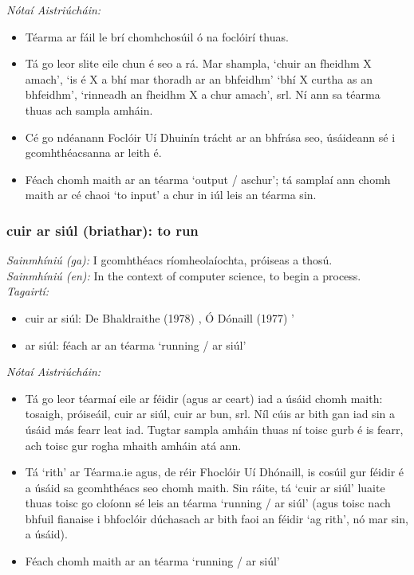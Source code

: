 \documentclass{article}
\begin{document}
 \noindent \textit{Nótaí Aistriúcháin:}
\begin{itemize}
	\item Téarma ar fáil le brí chomhchosúil ó na foclóirí thuas.
	\item Tá go leor slite eile chun é seo a rá. Mar shampla, `chuir an fheidhm X amach', `is é X a bhí mar thoradh ar an bhfeidhm' `bhí X curtha as an bhfeidhm', `rinneadh an fheidhm X a chur amach', srl. Ní ann sa téarma thuas ach sampla amháin.
	\item Cé go ndéanann Foclóir Uí Dhuinín trácht ar an bhfrása seo, úsáideann sé i gcomhthéacsanna ar leith é.
	\item Féach chomh maith ar an téarma `output / aschur'; tá samplaí ann chomh maith ar cé chaoi `to input' a chur in iúl leis an téarma sin.
\end{itemize}


\subsubsection*{cuir ar siúl (briathar): to run}
 \noindent \textit{Sainmhíniú (ga):} I gcomhthéacs ríomheolaíochta, próiseas a thosú.
\\
 \noindent \textit{Sainmhíniú (en):} In the context of computer science, to begin a process.
\\
 \noindent \textit{Tagairtí:}
\begin{itemize}
	\item cuir ar siúl: De Bhaldraithe (1978) \cite{de-bhaldraithe}, Ó Dónaill (1977) \cite{odonaill}'
	\item ar siúl: féach ar an téarma `running / ar siúl'
\end{itemize}

 \noindent \textit{Nótaí Aistriúcháin:}
\begin{itemize}
	\item Tá go leor téarmaí eile ar féidir (agus ar ceart) iad a úsáid chomh maith: tosaigh, próiseáil, cuir ar siúl, cuir ar bun, srl. Níl cúis ar bith gan iad sin a úsáid más fearr leat iad. Tugtar sampla amháin thuas ní toisc gurb é is fearr, ach toisc gur rogha mhaith amháin atá ann.
	\item Tá `rith' ar Téarma.ie agus, de réir Fhoclóir Uí Dhónaill, is cosúil gur féidir é a úsáid sa gcomhthéacs seo chomh maith. Sin ráite, tá `cuir ar siúl' luaite thuas toisc go cloíonn sé leis an téarma `running / ar siúl' (agus toisc nach bhfuil fianaise i bhfoclóir dúchasach ar bith faoi an féidir `ag rith', nó mar sin, a úsáid).
	\item Féach chomh maith ar an téarma `running / ar siúl'
\end{itemize}
\end{document}
